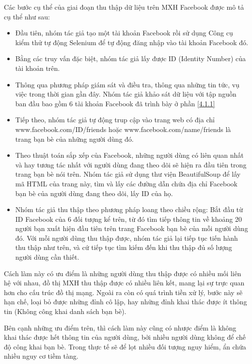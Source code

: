 Các bước cụ thể của giai đoạn thu thập dữ liệu trên MXH Facebook được mô tả cụ thể như sau:
\begin {itemize}
\item Đầu tiên, nhóm tác giả tạo một tài khoản Facebook rồi sử dụng Công cụ kiểm thử tự động Selenium để tự động đăng nhập vào tài khoản Facebook đó.

\item Bằng các truy vấn đặc biệt, nhóm tác giả lấy được ID (Identity Number) của tài khoản trên.

\item Thông qua phương pháp giám sát và điều tra, thông qua những tin tức, vụ việc trong thời gian gần đây. Nhóm tác giả khảo sát dữ liệu với tập nguồn ban đầu bao gồm 6 tài khoản Facebook đã trình bày ở phần \ref{4.1.1}

\item Tiếp theo, nhóm tác giả tự động trup cập vào trang web có địa chỉ www.facebook.com/{ID}/friends hoặc www.facebook.com/{name}/friends là trang bạn bè của những người dùng đó.

\item Theo thuật toán sắp xếp của Facebook, những người dùng có liên quan nhất và hay tương tác nhất với người dùng đang theo dõi sẽ hiện ra đầu tiên trong trang bạn bè nói trên. Nhóm tác giả sử dụng thư viện BeautifulSoup để lấy mã HTML của trang này, tìm và lấy các đường dẫn chứa địa chỉ Facebook bạn bè của người dùng đang theo dõi, lấy ID của họ.

\item Nhóm tác giả thu thập theo phương pháp loang theo chiều rộng: Bắt đầu từ ID Facebook của 6 đối tượng kể trên, từ đó tìm tiếp thông tin về khoảng 20 người bạn xuất hiện đầu tiên trên trang Facebook bạn bè của mỗi người dùng đó. Với mỗi người dùng thu thập được, nhóm tác giả lại tiếp tục tiến hành thu thập như trên, và cứ tiếp tục tìm kiếm đến khi thu thập đủ số lượng người dùng cần thiết.
\end {itemize}		
Cách làm này có ưu điểm là những người dùng thu thập được có nhiều mối liên hệ với nhau, đồ thị MXH thu thập được có nhiều liên kết, mang lại sự trực quan hơn cho cấu trúc đồ thị mạng. Ngoài ra còn có quá trình tiền xử lý, bước này sẽ hạn chế, loại bỏ được những đỉnh cô lập, hay những đỉnh khai thác được ít thông tin (Không công khai danh sách bạn bè).

Bên cạnh những ưu điểm trên, thì cách làm này cũng có nhược điểm là không khai thác được hết thông tin của người dùng, bởi nhiều người dùng không để chế độ công khai bạn bè. Trong thực tế sẽ để lọt nhiều đối tượng nguy hiểm, ẩn chứa nhiều nguy cơ tiềm tàng.

